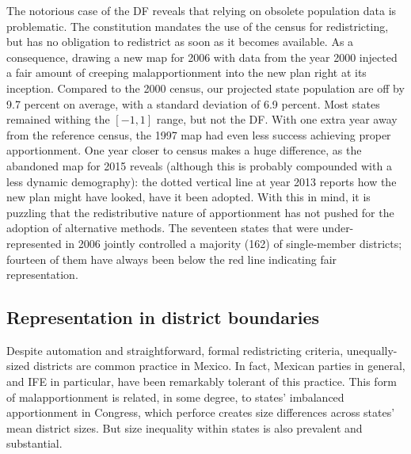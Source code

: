 \documentclass[letter,12pt]{article}
\begin{document}
The notorious case of the DF reveals that relying on obsolete population data is problematic. The constitution mandates the use of the census for redistricting, but has no obligation to redistrict as soon as it becomes available. As a consequence, drawing a new map for 2006 with data from the year 2000 injected a fair amount of creeping malapportionment into the new plan right at its inception. Compared to the 2000 census, our projected state population are off by 9.7 percent on average, with a standard deviation of 6.9 percent. Most states remained withing the $[-1,1]$ range, but not the DF. With one extra year away from the reference census, the 1997 map had even less success achieving proper apportionment. One year closer to census makes a huge difference, as the abandoned map for 2015 reveals (although this is probably compounded with a less dynamic demography): the dotted vertical line at year 2013 reports how the new plan might have looked, have it been adopted. With this in mind, it is puzzling that the redistributive nature of apportionment has not pushed for the adoption of alternative methods. The seventeen states that were under-represented in 2006 jointly controlled a majority (162) of single-member districts; fourteen of them have always been below the red line indicating fair representation. 


\subsection{Representation in district boundaries}

Despite automation and straightforward, formal redistricting criteria, unequally-sized districts are common practice in Mexico. In fact, Mexican parties in general, and IFE in particular, have been remarkably tolerant of this practice. This form of malapportionment is related, in some degree, to states' imbalanced apportionment in Congress, which perforce creates size differences across states' mean district sizes. But size inequality within states is also prevalent and substantial. 
\end{document}
